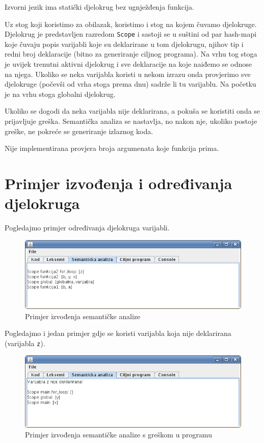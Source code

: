 Izvorni jezik ima statički djelokrug bez ugnježđenja funkcija. 

Uz stog koji koristimo za obilazak, koristimo i stog na kojem čuvamo djelokruge. Djelokrug
je predstavljen razredom \texttt{Scope} i sastoji se u suštini od par hash-mapi koje čuvaju
popis varijabli koje su deklarirane u tom djelokrugu, njihov tip i redni broj deklaracije (bitno za generiranje ciljnog programa).
Na vrhu tog stoga je uvijek trenutni aktivni djelokrug i sve deklaracije na koje naiđemo se odnose na njega.
Ukoliko se neka varijabla koristi u nekom izrazu onda provjerimo sve djelokruge (počevši od vrha stoga prema dnu)
sadrže li tu varijablu. Na početku je na vrhu stoga globalni djelokrug.

Ukoliko se dogodi da neka varijabla nije deklarirana, a pokuša se koristiti onda se prijavljuje greška. Semantička
analiza se nastavlja, no nakon nje, ukoliko postoje greške, ne pokreće se generiranje izlaznog koda.

Nije implementirana provjera broja argumenata koje funkcija prima.

\section{Primjer izvođenja i određivanja djelokruga}
Pogledajmo primjer određivanja djelokruga varijabli.



\begin{figure}[H]
  \centering
    \includegraphics[width=13cm]{primjer-semanticka1}
  \caption{Primjer izvođenja semantičke analize}
\end{figure}

\pagebreak

Pogledajmo i jedan primjer gdje se koristi varijabla koja nije deklarirana (varijabla \texttt{z}).


\begin{figure}[H]
  \centering
    \includegraphics[width=13cm]{primjer-semanticka2}
  \caption{Primjer izvođenja semantičke analize s greškom u programu}
\label{komponente}
\end{figure}

